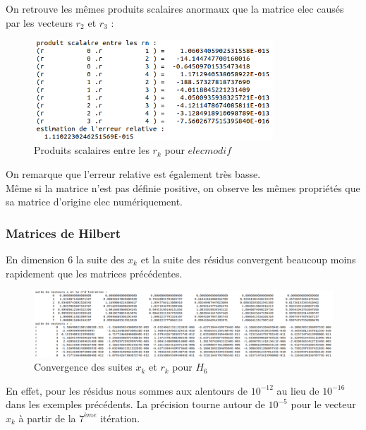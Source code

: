 \documentclass[12,french]{report}
\begin{document}
On retrouve les mêmes produits scalaires anormaux que la matrice elec causés par les vecteurs $r_{2}$ et $r_{3}$ :

\begin{figure}[H]
	\centering
	\includegraphics[width=0.8\textwidth]{./Images/ps_elecmodif}
	\caption{Produits scalaires entre les $r_{k}$ pour $elecmodif$}
\end{figure}\vspace{0.2cm}

On remarque que l'erreur relative est également très basse.\\

Même si la matrice n'est pas définie positive, on observe les mêmes propriétés que sa matrice d'origine elec numériquement.

\subsubsection{Matrices de Hilbert}

En dimension 6 la suite des $x_{k}$ et la suite des résidus convergent beaucoup moins rapidement que les matrices précédentes.

\begin{figure}[H]
	\centering
	\includegraphics[width=1\textwidth]{./Images/xr_H_6}
	\caption{Convergence des suites $x_{k}$ et $r_{k}$ pour $H_{6}$}
\end{figure}\vspace{0.2cm}

En effet, pour les résidus nous sommes aux alentours de $10^{-12}$ au lieu de $10^{-16}$ dans les exemples précédents. La précision tourne autour de $10^{-5}$ pour le vecteur $x_{k}$ à partir de la $7^{ème}$ itération.\\
\end{document}
